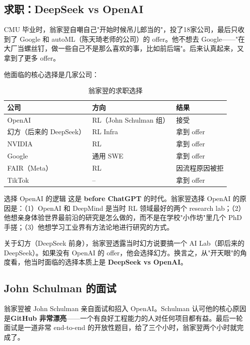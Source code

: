 \subsection{求职：DeepSeek vs OpenAI}

CMU 毕业时，翁家翌自嘲自己"开始时候吊儿郎当的"，投了18家公司，最后只收到了 Google 和 autoML（陈天琦老师的公司）的 offer。他不想去 Google——"在大厂当螺丝钉，做一些自己不是那么喜欢的事，比如前后端"。后来认真起来，又拿到了更多 offer。

他面临的核心选择是几家公司：

\begin{table}[H]
\centering
\begin{tabular}{lll}
\toprule
\textbf{公司} & \textbf{方向} & \textbf{结果} \\
\midrule
OpenAI & RL（John Schulman 组） & 接受 \\
幻方（后来的 DeepSeek） & RL Infra & 拿到 offer \\
NVIDIA & RL & 拿到 offer \\
Google & 通用 SWE & 拿到 offer \\
FAIR（Meta） & RL & 因流程原因被拒 \\
TikTok & -- & 拿到 offer \\
\bottomrule
\end{tabular}
\caption{翁家翌的求职选择}
\end{table}

\begin{importantbox}{选择 OpenAI 的逻辑}
这是 \textbf{before ChatGPT} 的时代。翁家翌选择 OpenAI 的原因是：（1）OpenAI 和 DeepMind 是当时 RL 领域最好的两个 research lab；（2）他想亲身体验世界最前沿的研究是怎么做的，而不是在学校"小作坊"里几个 PhD 手搓；（3）他想学习工业界有方法论地进行研究的方式。
\end{importantbox}

关于幻方（DeepSeek 前身），翁家翌透露当时幻方说要搞一个 AI Lab（即后来的 DeepSeek）。如果没有 OpenAI 的 offer，他会选择幻方。换言之，从"开天眼"的角度看，他当时面临的选择本质上是 \textbf{DeepSeek vs OpenAI}。

\subsection{John Schulman 的面试}

翁家翌被 John Schulman 亲自面试和招入 OpenAI。Schulman 认可他的核心原因是\textbf{GitHub 非常漂亮}——一个有良好工程能力的人对任何项目都有益。最后一轮面试是一道非常 end-to-end 的开放性题目，给了三个小时，翁家翌两个小时就完成了。

